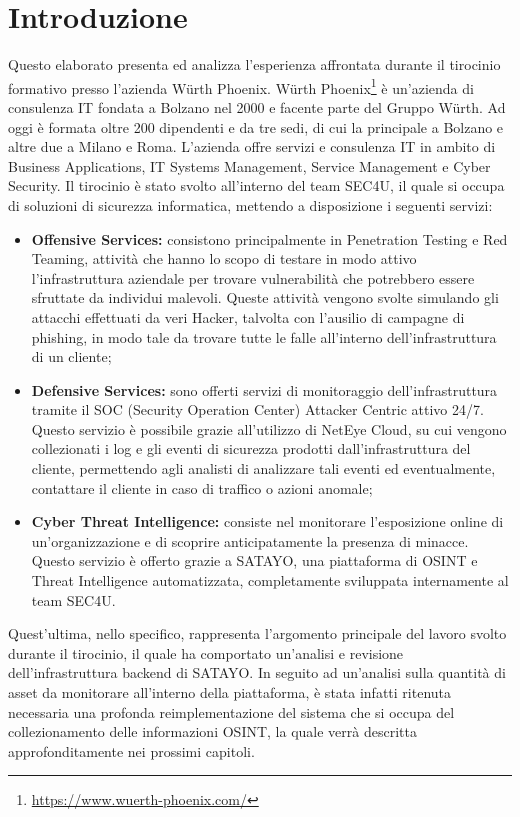 \chapter{Introduzione}
\label{cha:introduction}

Questo elaborato presenta ed analizza l'esperienza affrontata durante il
tirocinio formativo presso l'azienda Würth Phoenix. Würth Phoenix\footnote{\url{https://www.wuerth-phoenix.com/}}
è un'azienda di consulenza IT fondata a Bolzano nel 2000 e facente parte del
Gruppo Würth. Ad oggi è formata oltre 200 dipendenti e da tre sedi, di cui la
principale a Bolzano e altre due a Milano e Roma. L'azienda offre servizi e consulenza
IT in ambito di Business Applications, IT Systems Management, Service Management
e Cyber Security. Il tirocinio è stato svolto all'interno del team SEC4U, il quale
si occupa di soluzioni di sicurezza informatica, mettendo a disposizione i
seguenti servizi:

\begin{itemize}
  \item \textbf{Offensive Services:} consistono principalmente in Penetration
    Testing e Red Teaming, attività che hanno lo scopo di testare in modo attivo
    l'infrastruttura aziendale per trovare vulnerabilità che potrebbero essere sfruttate
    da individui malevoli. Queste attività vengono svolte simulando gli attacchi
    effettuati da veri Hacker, talvolta con l'ausilio di campagne di phishing,
    in modo tale da trovare tutte le falle all'interno dell'infrastruttura di un
    cliente;

  \item \textbf{Defensive Services:} sono offerti servizi di monitoraggio dell'infrastruttura
    tramite il SOC (Security Operation Center) Attacker Centric attivo 24/7.
    Questo servizio è possibile grazie all'utilizzo di NetEye Cloud, su cui vengono
    collezionati i log e gli eventi di sicurezza prodotti dall'infrastruttura del
    cliente, permettendo agli analisti di analizzare tali eventi ed
    eventualmente, contattare il cliente in caso di traffico o azioni anomale;

  \item \textbf{Cyber Threat Intelligence:} consiste nel monitorare l'esposizione
    online di un'organizzazione e di scoprire anticipatamente la presenza di
    minacce. Questo servizio è offerto grazie a SATAYO, una piattaforma di OSINT
    e Threat Intelligence automatizzata, completamente sviluppata internamente al
    team SEC4U.
\end{itemize}

Quest'ultima, nello specifico, rappresenta l'argomento principale del lavoro svolto
durante il tirocinio, il quale ha comportato un'analisi e revisione dell'infrastruttura
backend di SATAYO. In seguito ad un'analisi sulla quantità di asset da monitorare
all'interno della piattaforma, è stata infatti ritenuta necessaria una profonda
reimplementazione del sistema che si occupa del collezionamento delle
informazioni OSINT, la quale verrà descritta approfonditamente nei prossimi capitoli.
